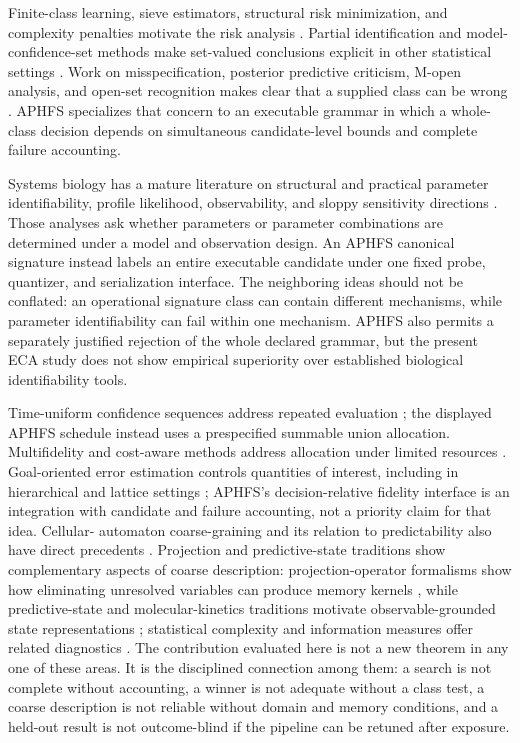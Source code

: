 \documentclass[10pt]{article}
\theoremstyle{definition}
\begin{document}
Finite-class learning, sieve estimators, structural risk minimization, and complexity penalties
motivate the risk analysis \citep{grenander1981,geman1982,vapnik1995,barron1991}. Partial
identification and model-confidence-set methods make set-valued conclusions explicit in other
statistical settings \citep{manski2003,hansen2011mcs}. Work on
misspecification, posterior predictive criticism, M-open analysis, and open-set recognition makes
clear that a supplied class can be wrong \citep{white1982,gelman1996,yao2018,scheirer2013}. APHFS
specializes that concern to an executable grammar in which a whole-class decision depends on
simultaneous candidate-level bounds and complete failure accounting.

Systems biology has a mature literature on structural and practical parameter identifiability,
profile likelihood, observability, and sloppy sensitivity directions
\citep{bellman1970identifiability,gutenkunst2007,raue2009,chis2011,villaverde2016}. Those analyses ask whether parameters or parameter
combinations are determined under a model and observation design. An APHFS canonical signature
instead labels an entire executable candidate under one fixed probe, quantizer, and serialization
interface. The neighboring ideas should not be conflated: an operational signature class can
contain different mechanisms, while parameter identifiability can fail within one mechanism.
APHFS also permits a separately justified rejection of the whole declared grammar, but the present
ECA study does not show empirical superiority over established biological identifiability tools.

Time-uniform confidence sequences address repeated evaluation \citep{howard2021,waudby2024}; the
displayed APHFS schedule instead uses a prespecified summable union allocation. Multifidelity and
cost-aware methods address allocation under limited resources
\citep{babu2004,jamieson2016,li2018,kandasamy2017}. Goal-oriented error estimation controls
quantities of interest, including in hierarchical and lattice settings
\citep{prudhomme1999goal,oden2005lattice}; APHFS's decision-relative fidelity interface is an
integration with candidate and failure accounting, not a priority claim for that idea. Cellular-
automaton coarse-graining and its relation to predictability also have direct precedents
\citep{israeli2004,israeli2006}. Projection and predictive-state traditions
show complementary aspects of coarse description: projection-operator formalisms show how
eliminating unresolved variables can produce memory kernels
\citep{zwanzig1961,zwanzig1972correction,mori1965}, while predictive-state and molecular-kinetics
traditions motivate observable-grounded state representations \citep{littman2001,prinz2011};
statistical complexity and information measures offer related diagnostics
\citep{crutchfield1989,hoel2017,rosas2020}. The contribution evaluated here is not a new theorem in
any one of these areas. It is the disciplined connection among them: a search is not complete
without accounting, a winner is not adequate without a class test, a coarse description is not
reliable without domain and memory conditions, and a held-out result is not outcome-blind if the
pipeline can be retuned after exposure.
\end{document}
